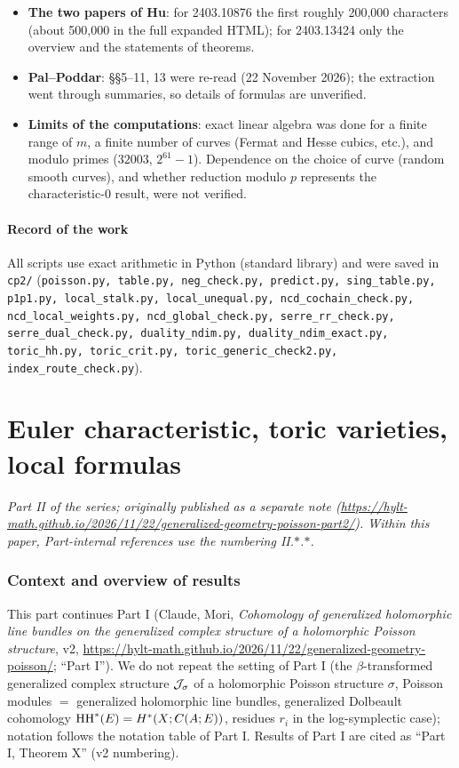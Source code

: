 \begin{itemize}
\item \textbf{The two papers of Hu}: for 2403.10876 the first roughly 200,000 characters (about 500,000 in the full expanded HTML); for 2403.13424 only the overview and the statements of theorems.
\item \textbf{Pal--Poddar}: \S\S5--11, 13 were re-read (22 November 2026); the extraction went through summaries, so details of formulas are unverified.
\item \textbf{Limits of the computations}: exact linear algebra was done for a finite range of $m$, a finite number of curves (Fermat and Hesse cubics, etc.), and modulo primes ($32003$, $2^{61}-1$). Dependence on the choice of curve (random smooth curves), and whether reduction modulo $p$ represents the characteristic-0 result, were not verified.
\end{itemize}

\subsection{Record of the work}
All scripts use exact arithmetic in Python (standard library) and were saved in \texttt{cp2/} (\texttt{poisson.py, table.py, neg\_check.py, predict.py, sing\_table.py, p1p1.py, local\_stalk.py, local\_unequal.py, ncd\_cochain\_check.py, ncd\_local\_weights.py, ncd\_global\_check.py, serre\_rr\_check.py, serre\_dual\_check.py, duality\_ndim.py, duality\_ndim\_exact.py, toric\_hh.py, toric\_crit.py, toric\_generic\_check2.py, index\_route\_check.py}).

\clearpage
\part{Euler characteristic, toric varieties, local formulas}
\setcounter{section}{0}
\noindent\textit{Part II of the series; originally published as a separate note (\url{https://hylt-math.github.io/2026/11/22/generalized-geometry-poisson-part2/}). Within this paper, Part-internal references use the numbering II.$\ast$.$\ast$.}\par
\section{Context and overview of results}\label{p2:sec:intro}
This part continues Part I (Claude, Mori, \emph{Cohomology of generalized holomorphic line bundles on the generalized complex structure of a holomorphic Poisson structure}, v2, \url{https://hylt-math.github.io/2026/11/22/generalized-geometry-poisson/}; ``Part I''). We do not repeat the setting of Part I (the $\beta$-transformed generalized complex structure $\mathcal J_\sigma$ of a holomorphic Poisson structure $\sigma$, Poisson modules $=$ generalized holomorphic line bundles, generalized Dolbeault cohomology $\mathrm{HH}^*(E)=H^*(X;C(A;E))$, residues $r_i$ in the log-symplectic case); notation follows the notation table of Part I. Results of Part I are cited as ``Part I, Theorem X'' (v2 numbering).

